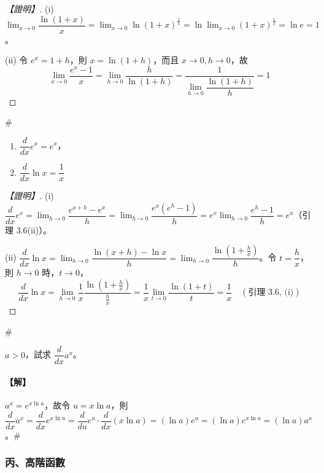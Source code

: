 \begin{proof}[【證明】]
(i) $\lim_{x\to 0}\dfrac{\ln(1+x)}{x} = \lim_{x\to 0}\ln(1+x)^{\frac{1}{x}} = \ln\lim_{x\to 0}(1+x)^{\frac{1}{x}} = \ln e = 1$。

(ii) 令 $e^x = 1+h$，則 $x=\ln(1+h)$，而且 $x\longrightarrow 0, h\longrightarrow 0$，故
\[ \lim_{x\to 0}\dfrac{e^x-1}{x} = \lim_{h\to 0}\dfrac{h}{\ln(1+h)} = \dfrac{1}{\lim_{h\to 0}\dfrac{\ln(1+h)}{h}} = 1 \]
\end{proof}\hfill$\#$

\setcounter{theorem}{6}
\begin{theorem}\label{thm:b6s-app4-deriv-exp-ln}
\begin{enumerate}[label=(\roman*), leftmargin=2em]
  \item $\dfrac{d}{dx}e^x = e^x$，
  \item $\dfrac{d}{dx}\ln x = \dfrac{1}{x}$
\end{enumerate}
\end{theorem}

\begin{proof}[【證明】]
(i) $\dfrac{d}{dx}e^x = \lim_{h\to 0}\dfrac{e^{x+h}-e^x}{h} = \lim_{h\to 0}\dfrac{e^x(e^h-1)}{h} = e^x\lim_{h\to 0}\dfrac{e^h-1}{h} = e^x$（引理 3.6(ii)）。

(ii) $\dfrac{d}{dx}\ln x = \lim_{h\to 0}\dfrac{\ln(x+h)-\ln x}{h} = \lim_{h\to 0}\dfrac{\ln\left(1+\frac{h}{x}\right)}{h}$。令 $t=\dfrac{h}{x}$，則 $h\longrightarrow 0$ 時，$t\longrightarrow 0$，
\[ \dfrac{d}{dx}\ln x = \lim_{h\to 0}\dfrac{1}{x}\dfrac{\ln\left(1+\frac{h}{x}\right)}{\frac{h}{x}} = \dfrac{1}{x}\lim_{t\to 0}\dfrac{\ln(1+t)}{t} = \dfrac{1}{x} \quad (\text{引理 3.6, (i)}) \]
\end{proof}\hfill$\#$

\begin{example}\label{ex:b6s-app4-14}
$a>0$，試求 $\dfrac{d}{dx} a^x$。
\end{example}

\paragraph{【解】}
$a^x = e^{x\ln a}$，故令 $u=x\ln a$，則 $\dfrac{d}{dx}a^x = \dfrac{d}{dx}e^{x\ln a} = \dfrac{d}{du}e^u \cdot \dfrac{d}{dx}(x\ln a) = (\ln a)e^u = (\ln a)e^{x\ln a} = (\ln a)a^x$。\hfill$\#$

\subsubsection*{丙、高階函數}


